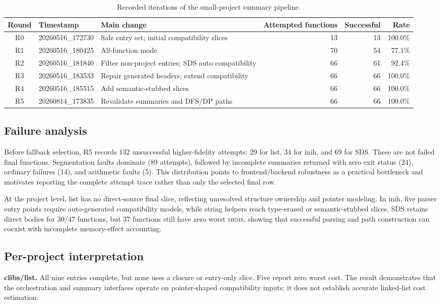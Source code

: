 \documentclass[10pt,conference]{IEEEtran}
\newcommand{\mems}{\textsc{mems}\xspace}
\begin{document}
\begin{table}[t]
\centering
\caption{Recorded iterations of the small-project summary pipeline.}
\label{tab:iterations}
\begin{tabular}{cllrrr}
\toprule
Round & Timestamp & Main change & Attempted functions & Successful & Rate\\
\midrule
R0 & 20260516\_172730 & Safe entry set; initial compatibility slices & 13 & 13 & 100.0\%\\
R1 & 20260516\_180425 & All-function mode & 70 & 54 & 77.1\%\\
R2 & 20260516\_181840 & Filter non-project entries; SDS auto compatibility & 66 & 61 & 92.4\%\\
R3 & 20260516\_183533 & Repair generated headers; extend compatibility & 66 & 66 & 100.0\%\\
R4 & 20260516\_185515 & Add semantic-stubbed slices & 66 & 66 & 100.0\%\\
R5 & 20260814\_173835 & Revalidate summaries and DFS/DP paths & 66 & 66 & 100.0\%\\
\bottomrule
\end{tabular}
\end{table}

\subsection{Failure analysis}
Before fallback selection, R5 records 132 unsuccessful higher-fidelity attempts: 29 for list, 34 for inih, and 69 for SDS. These are not failed final functions. Segmentation faults dominate (89 attempts), followed by incomplete summaries returned with zero exit status (24), ordinary failures (14), and arithmetic faults (5). This distribution points to frontend/backend robustness as a practical bottleneck and motivates reporting the complete attempt trace rather than only the selected final row.

At the project level, list has no direct-source final slice, reflecting unresolved structure ownership and pointer modeling. In inih, five parser entry points require auto-generated compatibility models, while string helpers reach type-erased or semantic-stubbed slices. SDS retains direct bodies for 30/47 functions, but 37 functions still have zero worst \mems, showing that successful parsing and path construction can coexist with incomplete memory-effect accounting.

\subsection{Per-project interpretation}
\textbf{clibs/list.} All nine entries complete, but none uses a closure or entry-only slice. Five report zero worst cost. The result demonstrates that the orchestration and summary interfaces operate on pointer-shaped compatibility inputs; it does not establish accurate linked-list cost estimation.
\end{document}
